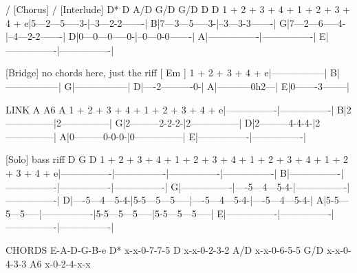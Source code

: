 \begin{lsttab}
[Intro] / [Chorus] / [Interlude]
  D*  D  A/D   G/D  G/D  D D
  1 + 2 + 3 + 4 +  1 + 2 + 3 + 4 +
e|5---2---5-----3-|--3---2-2-------|
B|7---3---5-----3-|--3---3-3-------|
G|7---2---6-----4-|--4---2-2-------|
D|0---0---0-----0-|--0---0-0-------|
A|----------------|----------------|
E|----------------|----------------|
 
[Bridge] no chords here, just the riff
[ Em ]
  1 + 2 + 3 + 4  +
e|-----------------|
B|-----------------|
G|-----------------|
D|----2----------0-|
A|-----------0h2---|
E|0-------3--------|
 
LINK
  A         A6     A
  1 + 2 + 3 + 4 +  1 + 2 + 3 + 4 +
e|----------------|----------------|
B|2---------------|2---------------|
G|2---------2-2-2-|2---------------|
D|2---------4-4-4-|2---------------|
A|0---------0-0-0-|0---------------|
E|----------------|----------------|
 
[Solo] bass riff
  D                G                D
  1 + 2 + 3 + 4 +  1 + 2 + 3 + 4 +  1 + 2 + 3 + 4 +  1 + 2 + 3 + 4 +
e|----------------|----------------|----------------|----------------|
B|----------------|----------------|----------------|----------------|
G|----------------|----5---4---5-4-|----------------|----------------|
D|----5---4---5-4-|5-5---5---5-----|----5---4---5-4-|----5---4---5-4-|
A|5-5---5---5-----|----------------|5-5---5---5-----|5-5---5---5-----|
E|----------------|----------------|----------------|----------------|
 
CHORDS
     E-A-D-G-B-e
D*   x-x-0-7-7-5
D    x-x-0-2-3-2
A/D  x-x-0-6-5-5
G/D  x-x-0-4-3-3
A6   x-0-2-4-x-x
\end{lsttab}
\newpage
